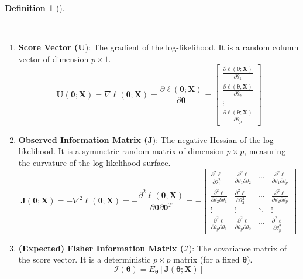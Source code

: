 \documentclass[
  letterpaper,
  DIV=11,
  numbers=noendperiod]{scrreprt}
\renewcommand{\[}{\begin{equation}}
\renewcommand{\]}{\end{equation}}
\theoremstyle{definition}
\newtheorem{definition}{Definition}[chapter]
\theoremstyle{plain}
\theoremstyle{plain}
\theoremstyle{plain}
\theoremstyle{definition}
\theoremstyle{plain}
\theoremstyle{remark}
\begin{document}
\begin{definition}[]\protect\hypertarget{def-score-fisher}{}\label{def-score-fisher}

~

\begin{enumerate}
\def\labelenumi{\arabic{enumi}.}
\item
  \textbf{Score Vector (}\(\mathbf{U}\)): The gradient of the
  log-likelihood. It is a random column vector of dimension
  \(p \times 1\). \[
   \mathbf{U}(\boldsymbol{\theta}; \mathbf{X}) = \nabla \ell(\boldsymbol{\theta}; \mathbf{X}) = \frac{\partial \ell(\boldsymbol{\theta}; \mathbf{X})}{\partial \boldsymbol{\theta}} = 
   \begin{bmatrix}
   \frac{\partial \ell(\boldsymbol{\theta}; \mathbf{X})}{\partial \theta_1} \\[6pt]
   \frac{\partial \ell(\boldsymbol{\theta}; \mathbf{X})}{\partial \theta_2} \\[6pt]
   \vdots \\[6pt]
   \frac{\partial \ell(\boldsymbol{\theta}; \mathbf{X})}{\partial \theta_p}
   \end{bmatrix}
   \]
\item
  \textbf{Observed Information Matrix (}\(\mathbf{J}\)): The negative
  Hessian of the log-likelihood. It is a symmetric random matrix of
  dimension \(p \times p\), measuring the curvature of the
  log-likelihood surface. \[
   \mathbf{J}(\boldsymbol{\theta}; \mathbf{X}) = - \nabla^2 \ell(\boldsymbol{\theta}; \mathbf{X}) = - \frac{\partial^2 \ell(\boldsymbol{\theta}; \mathbf{X})}{\partial \boldsymbol{\theta} \partial \boldsymbol{\theta}^T} = -
   \begin{bmatrix}
   \frac{\partial^2 \ell}{\partial \theta_1^2} & \frac{\partial^2 \ell}{\partial \theta_1 \partial \theta_2} & \cdots & \frac{\partial^2 \ell}{\partial \theta_1 \partial \theta_p} \\[8pt]
   \frac{\partial^2 \ell}{\partial \theta_2 \partial \theta_1} & \frac{\partial^2 \ell}{\partial \theta_2^2} & \cdots & \frac{\partial^2 \ell}{\partial \theta_2 \partial \theta_p} \\[8pt]
   \vdots & \vdots & \ddots & \vdots \\[8pt]
   \frac{\partial^2 \ell}{\partial \theta_p \partial \theta_1} & \frac{\partial^2 \ell}{\partial \theta_p \partial \theta_2} & \cdots & \frac{\partial^2 \ell}{\partial \theta_p^2}
   \end{bmatrix}
   \]
\item
  \textbf{(Expected) Fisher Information Matrix (}\(\mathcal{I}\)): The
  covariance matrix of the score vector. It is a deterministic
  \(p \times p\) matrix (for a fixed \(\boldsymbol{\theta}\)). \[
   \mathcal{I}(\boldsymbol{\theta}) = E_{\boldsymbol{\theta}} \left[ \mathbf{J}(\boldsymbol{\theta}; \mathbf{X}) \right]
   \]
\end{enumerate}

\end{definition}
\end{document}
